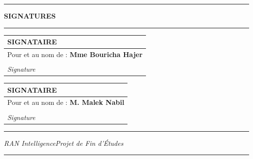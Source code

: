 \documentclass[12pt,a4paper]{report}
\begin{document}
\clearpage\thispagestyle{empty}
\begin{center}\color{borderblue}\rule{0.82\textwidth}{0.6pt}\vspace{0.18cm}
{\Large\bfseries\color{borderblue} SIGNATURES}\vspace{0.18cm}\color{borderblue}\rule{0.82\textwidth}{0.6pt}\end{center}
\vspace{1.15cm}
\begin{center}\setlength{\arrayrulewidth}{0.6pt}\renewcommand{\arraystretch}{1.4}
\begin{tabular}{|p{}|}\hline\centering\bfseries\MakeUppercase{Signataire}\tabularnewline\hline
\begin{minipage}[c][1.7cm][c]{0.82\textwidth}\large Pour et au nom de : \textbf{Mme Bouricha Hajer}\end{minipage}\tabularnewline\hline
\begin{minipage}[c][2.4cm][c]{0.82\textwidth}\begin{flushright}\begin{minipage}{0.38\textwidth}\centering\dotfill\\[0.18cm]\textit{Signature}\end{minipage}\end{flushright}\end{minipage}\tabularnewline\hline\end{tabular}\end{center}
\vspace{1.15cm}
\begin{center}\begin{tabular}{|p{}|}\hline\centering\bfseries\MakeUppercase{Signataire}\tabularnewline\hline
\begin{minipage}[c][1.7cm][c]{0.82\textwidth}\large Pour et au nom de : \textbf{M. Malek Nabil}\end{minipage}\tabularnewline\hline
\begin{minipage}[c][2.4cm][c]{0.82\textwidth}\begin{flushright}\begin{minipage}{0.38\textwidth}\centering\dotfill\\[0.18cm]\textit{Signature}\end{minipage}\end{flushright}\end{minipage}\tabularnewline\hline\end{tabular}\end{center}
\vfill\begin{center}\color{borderblue}\rule{0.82\textwidth}{0.6pt}\end{center}
\vspace{0.55cm}\noindent\hspace*{0.09\textwidth}\textit{RAN Intelligence}\hfill\textit{Projet de Fin d'Études}\hspace*{0.09\textwidth}
\vspace{0.25cm}\begin{center}\color{borderblue}\rule{0.82\textwidth}{0.6pt}\end{center}
\end{document}
